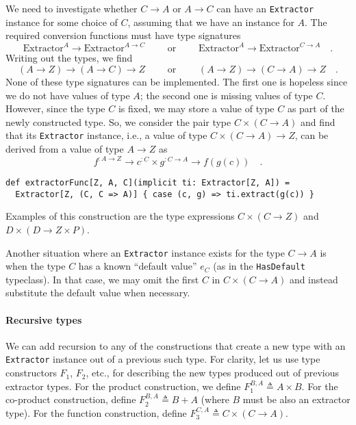 We need to investigate whether $C\rightarrow A$ or $A\rightarrow C$
can have an \lstinline!Extractor! instance for some choice of $C$,
assuming that we have an instance for $A$. The required conversion
functions must have type signatures
\[
\text{Extractor}^{A}\rightarrow\text{Extractor}^{A\rightarrow C}\quad\quad\text{ or }\quad\quad\text{Extractor}^{A}\rightarrow\text{Extractor}^{C\rightarrow A}\quad.
\]
Writing out the types, we find
\[
\left(A\rightarrow Z\right)\rightarrow\left(A\rightarrow C\right)\rightarrow Z\quad\quad\text{ or }\quad\quad\left(A\rightarrow Z\right)\rightarrow\left(C\rightarrow A\right)\rightarrow Z\quad.
\]
None of these type signatures can be implemented. The first one is
hopeless since we do not have values of type $A$; the second one
is missing values of type $C$. However, since the type $C$ is fixed,
we may store a value of type $C$ as part of the newly constructed
type. So, we consider the pair type $C\times\left(C\rightarrow A\right)$
and find that its \lstinline!Extractor! instance, i.e., a value of
type $C\times\left(C\rightarrow A\right)\rightarrow Z$, can be derived
from a value of type $A\rightarrow Z$ as
\[
f^{:A\rightarrow Z}\rightarrow c^{:C}\times g^{:C\rightarrow A}\rightarrow f(g(c))\quad.
\]
\begin{lstlisting}
def extractorFunc[Z, A, C](implicit ti: Extractor[Z, A]) =
  Extractor[Z, (C, C => A)] { case (c, g) => ti.extract(g(c)) }
\end{lstlisting}
Examples of this construction are the type expressions $C\times\left(C\rightarrow Z\right)$
and $D\times\left(D\rightarrow Z\times P\right)$.

Another situation where an \lstinline!Extractor! instance exists
for the type $C\rightarrow A$ is when the type $C$ has a known \textsf{``}default
value\textsf{''} $e_{C}$ (as in the \lstinline!HasDefault! typeclass). In
that case, we may omit the first $C$ in $C\times(C\rightarrow A)$
and instead substitute the default value when necessary.

\paragraph{Recursive types}

We can add recursion to any of the constructions that create a new
type with an \lstinline!Extractor! instance out of a previous such
type. For clarity, let us use type constructors $F_{1}$, $F_{2}$,
etc., for describing the new types produced out of previous extractor
types. For the product construction, we define $F_{1}^{B,A}\triangleq A\times B$.
For the co-product construction, define $F_{2}^{B,A}\triangleq B+A$
(where $B$ must be also an extractor type). For the function construction,
define $F_{3}^{C,A}\triangleq C\times\left(C\rightarrow A\right)$.


